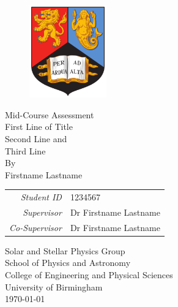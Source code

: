 \thispagestyle{empty}
\providecommand\pdfbookmark[3][]{} \pdfbookmark[0]{Title Page}{bm:Title}
\vspace*{1cm}
\begin{figure}[ht!]
    \centering
    \includegraphics[height=4cm]{frontmatter/images/BirminghamUniversityCrest.png}
\end{figure}
\vfill
\begin{center}
    {\large{Mid-Course Assessment}}\\[1.0em]
    {\huge{First Line of Title}}\\[0.5em]
    {\huge{Second Line and}}\\[0.5em]
    {\huge{Third Line}}\\[0.5em]
    \vfill
    By\\[\baselineskip]
    {\Large{Firstname Lastname}}
    \vfill
    \begin{tabular}{rl}
        \emph{Student ID} & 1234567\\[-0.8em]
        \emph{Supervisor} & Dr Firstname Lastname\\[-0.8em]
        \emph{Co-Supervisor} & Dr Firstname Lastname\\[-0.8em] 
    \end{tabular}
\end{center}
\begin{center}
    Solar and Stellar Physics Group\\[-0.8em]
    School of Physics and Astronomy\\[-0.8em]
    College of Engineering and Physical Sciences\\[-0.8em]
    University of Birmingham\\[1.0em]
    \today\\[\baselineskip]
\end{center}
\clearpage

